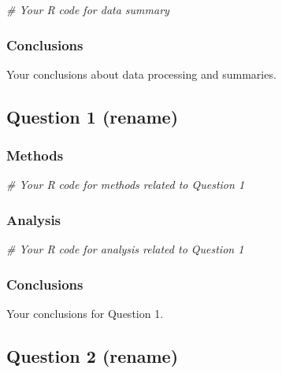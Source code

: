 \documentclass[
]{article}
\newenvironment{Shaded}{\begin{snugshade}}{\end{snugshade}}
\newcommand{\CommentTok}[1]{\textcolor[rgb]{0.56,0.35,0.01}{\textit{#1}}}
\begin{document}
\begin{Shaded}
\begin{Highlighting}[]
\CommentTok{\# Your R code for data summary}
\end{Highlighting}
\end{Shaded}

\subsubsection{Conclusions}\label{conclusions}

Your conclusions about data processing and summaries.

\subsection{Question 1 (rename)}\label{question-1-rename}

\subsubsection{Methods}\label{methods-1}

\begin{Shaded}
\begin{Highlighting}[]
\CommentTok{\# Your R code for methods related to Question 1}
\end{Highlighting}
\end{Shaded}

\subsubsection{Analysis}\label{analysis-1}

\begin{Shaded}
\begin{Highlighting}[]
\CommentTok{\# Your R code for analysis related to Question 1}
\end{Highlighting}
\end{Shaded}

\subsubsection{Conclusions}\label{conclusions-1}

Your conclusions for Question 1.

\subsection{Question 2 (rename)}\label{question-2-rename}
\end{document}
